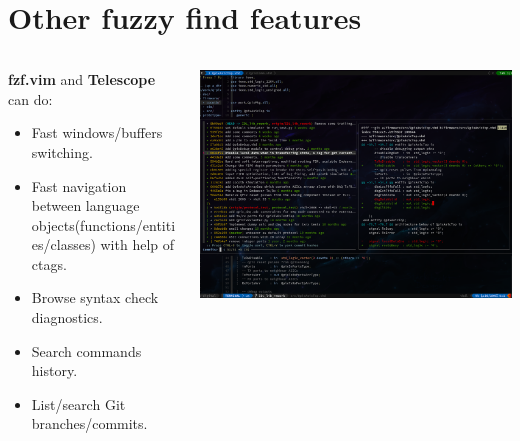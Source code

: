 \documentclass[aspectratio=169]{beamer}
\begin{document}
\section*{Other fuzzy find features}
\begin{frame}{\secname}
  \begin{columns}
    \begin{column}{0.5\textwidth}
      \textbf{fzf.vim} and \textbf{Telescope} can do: 
      \begin{itemize}
        \item Fast windows/buffers switching. 
        \item Fast navigation between language objects(functions/entities/classes) with help of ctags. 
        \item Browse syntax check diagnostics. 
        \item Search commands history. 
        \item List/search Git branches/commits.
      \end{itemize}
    \end{column}
    \begin{column}{0.6\textwidth}
      \includegraphics[width=1.0\textwidth]{figs/git_fzf_commits.png}
      
    \end{column}
  \end{columns}
  	
\end{frame}
\end{document}
